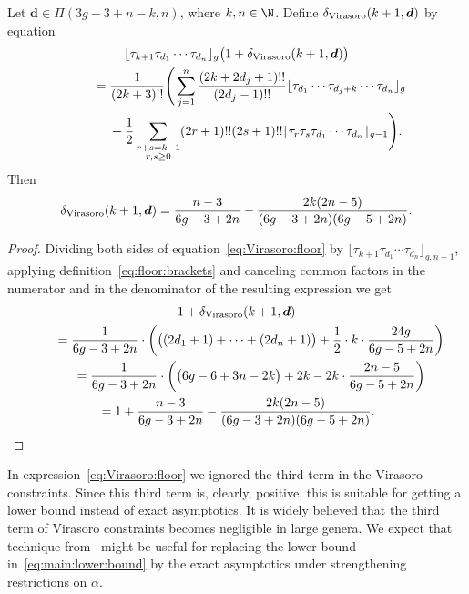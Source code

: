 \begin{Lemma}\label{lm:Virasoro}
Let $\boldsymbol{d}\in\Pi(3g-3+n-k,n)$, where $k,n\in\N$.
Define $\delta_{\rm Virasoro}(k+1,\boldsymbol{d})$
by equation
\begin{gather}
\lfloor\tau_{k+1}\tau_{d_1}\cdots\tau_{d_n}\rfloor_g
\big(1+\delta_{\rm Virasoro}(k+1,\boldsymbol{d})\big)
\nonumber\\
\qquad{} =\frac{1}{(2k+3)!!}
\Bigg(\sum_{j=1}^n
\frac{(2k+2d_j+1)!!}{(2d_j-1)!!}\lfloor\tau_{d_1}\cdots
\tau_{d_{j}+k}\cdots\tau_{d_n}\rfloor_g\nonumber\\
\qquad\quad{} +\frac{1}{2}\sum_{\substack{r+s=k-1\\r,s\ge 0}}
(2r+1)!!(2s+1)!!\lfloor\tau_r\tau_s\tau_{d_1}\cdots\tau_{d_n}\rfloor_{g-1}\Bigg) .\label{eq:Virasoro:floor}
\end{gather}
Then
\begin{gather}\label{eq:delta:Virasoro}
\delta_{\rm Virasoro}(k+1,\boldsymbol{d})
=\frac{n-3}{6g-3+2n}-\frac{2k(2n-5)}{(6g-3+2n)(6g-5+2n)} .
\end{gather}
\end{Lemma}

\begin{proof}Dividing both sides of equation~\eqref{eq:Virasoro:floor} by
$\lfloor \tau_{k+1}\tau_{d_1} \cdots \tau_{d_n}\rfloor_{g,n+1}$,
applying definition~\eqref{eq:floor:brackets}
and canceling common factors in the numerator and in the denominator
of the resulting expression we get
\begin{gather*}
1+\delta_{\rm Virasoro}(k+1,\boldsymbol{d})\\
\qquad{} =
\frac{1}{6g-3+2n}\cdot\left(
\big((2d_1+1)+\dots+(2d_n+1)\big)
+\frac{1}{2}\cdot k\cdot \frac{24g}{6g-5+2n}\right) \\
 \qquad{} =\frac{1}{6g-3+2n}\cdot\left(
\big(6g-6+3n-2k\big)+2k-2k\cdot\frac{2n-5}{6g-5+2n}\right)\\
\qquad{} = 1+\frac{n-3}{6g-3+2n}-\frac{2k(2n-5)}{(6g-3+2n)(6g-5+2n)} .\tag*{\qed}
\end{gather*}\renewcommand{\qed}{}
\end{proof}

\begin{Remark}\label{rm:lower:bound:Virasoro}
In expression~\eqref{eq:Virasoro:floor} we ignored the third term in the Virasoro constraints. Since this third term is, clearly, positive,
this is suitable for getting a lower bound
instead of exact asymptotics.
It is widely believed that the third term
of Virasoro constraints becomes negligible in large genera. We expect that technique from~\cite{Aggarwal:Siegel:Veech} might be useful for replacing
the lower bound in~\eqref{eq:main:lower:bound} by the exact asymptotics
under strengthening restrictions on $\alpha$.
\end{Remark}


